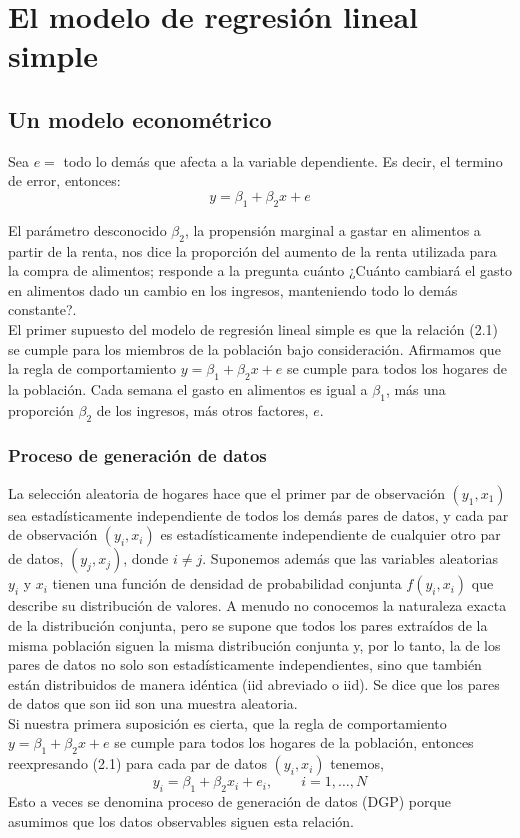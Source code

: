 \chapter{El modelo de regresión lineal simple}


\section{Un modelo econométrico}
Sea $e=$ todo lo demás que afecta a la variable dependiente. Es decir, el termino de error, entonces:
\begin{equation}
    y=\beta_1 + \beta_2 x  + e
\end{equation}

El parámetro desconocido $\beta_2$, la propensión marginal a gastar en alimentos a partir de la renta, nos dice la proporción del aumento de la renta utilizada para la compra de alimentos; responde a la pregunta cuánto ¿Cuánto cambiará el gasto en alimentos dado un cambio en los ingresos, manteniendo todo lo demás constante?.\\
El primer supuesto del modelo de regresión lineal simple es que la relación (2.1) se cumple para los miembros de la población bajo consideración. Afirmamos que la regla de comportamiento $y = \beta_1 + \beta_2 x + e$ se cumple para todos los hogares de la población. Cada semana el gasto en alimentos es igual a $\beta_1$, más una proporción $\beta_2$ de los ingresos, más otros factores, $e$.

\subsection{Proceso de generación de datos}
La selección aleatoria de hogares hace que el primer par de observación $(y_1, x_1)$ sea estadísticamente independiente de todos los demás pares de datos, y cada par de observación $(y_i, x_i)$ es estadísticamente independiente de cualquier otro par de datos, $(y_j, x_j)$, donde $i \neq j$. Suponemos además que las variables aleatorias $y_i$ y $x_i$ tienen una función de densidad de probabilidad conjunta $f(y_i , x_i)$ que describe su distribución de valores. A menudo no conocemos la naturaleza exacta de la distribución conjunta, pero se supone que todos los pares extraídos de la misma población siguen la misma distribución conjunta y, por lo tanto, la de los pares de datos no solo son estadísticamente independientes, sino que también están distribuidos de manera idéntica (iid abreviado o iid). Se dice que los pares de datos que son iid son una muestra aleatoria.\\
Si nuestra primera suposición es cierta, que la regla de comportamiento $y = \beta_1 + \beta_2x + e$ se cumple para todos los hogares de la población, entonces reexpresando (2.1) para cada par de datos $(y_i, x_i)$ tenemos,
$$y_i = \beta_1 + \beta_2 x_i + e_i,\qquad i=1,\ldots, N$$
Esto a veces se denomina proceso de generación de datos (DGP) porque asumimos que los datos observables siguen esta relación.

